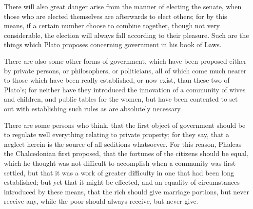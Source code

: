 There will also great danger arise from the manner of electing the senate,
when those who are elected themselves are afterwards to elect others; for
by this means, if a certain number choose to combine together, though not
very considerable, the election will always fall according to their
pleasure. Such are the things which Plato proposes concerning government
in his book of Laws.


There are also some other forms of government, which have been proposed
either by private persons, or philosophers, or politicians, all of which
come much nearer to those which have been really established, or now
exist, than these two of Plato's; for neither have they introduced the
innovation of a community of wives and children, and public tables for the
women, but have been contented to set out with establishing such rules as
are absolutely necessary.

There are some persons who think, that the first object of government
should be to regulate well everything relating to private property; for
they say, that a neglect herein is the source of all seditions whatsoever.
For this reason, Phaleas the Chalcedonian first proposed, that the
fortunes of the citizens should be equal, which he thought was not
difficult to accomplish when a community was first settled, but that it
was a work of greater difficulty in one that had been long established;
but yet that it might be effected, and an equality of circumstances
introduced by these means, that the rich should give marriage portions,
but never receive any, while the poor should always receive, but never
give.

